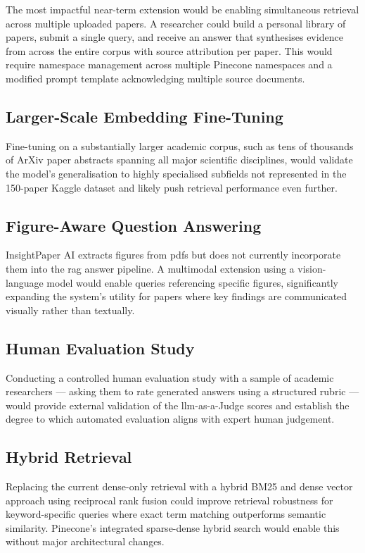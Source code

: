 The most impactful near-term extension would be enabling simultaneous retrieval across multiple uploaded papers. A researcher could build a personal library of papers, submit a single query, and receive an answer that synthesises evidence from across the entire corpus with source attribution per paper. This would require namespace management across multiple Pinecone namespaces and a modified prompt template acknowledging multiple source documents.

\subsection{Larger-Scale Embedding Fine-Tuning}

Fine-tuning on a substantially larger academic corpus, such as tens of thousands of ArXiv paper abstracts spanning all major scientific disciplines, would validate the model's generalisation to highly specialised subfields not represented in the 150-paper Kaggle dataset and likely push retrieval performance even further.

\subsection{Figure-Aware Question Answering}

InsightPaper AI extracts figures from \gls{pdf}s but does not currently incorporate them into the \gls{rag} answer pipeline. A multimodal extension using a vision-language model would enable queries referencing specific figures, significantly expanding the system's utility for papers where key findings are communicated visually rather than textually.

\subsection{Human Evaluation Study}

Conducting a controlled human evaluation study with a sample of academic researchers — asking them to rate generated answers using a structured rubric — would provide external validation of the \gls{llm}-as-a-Judge scores and establish the degree to which automated evaluation aligns with expert human judgement.

\subsection{Hybrid Retrieval}

Replacing the current dense-only retrieval with a hybrid BM25 and dense vector approach using reciprocal rank fusion could improve retrieval robustness for keyword-specific queries where exact term matching outperforms semantic similarity. Pinecone's integrated sparse-dense hybrid search would enable this without major architectural changes.

